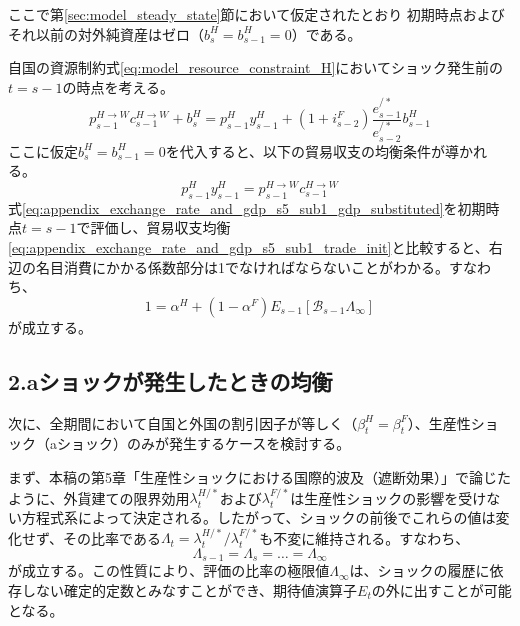 ここで第\ref{sec:model_steady_state}節において仮定されたとおり
初期時点およびそれ以前の対外純資産はゼロ（\(b_s^H=b_{s-1}^H=0\)）である。

自国の資源制約式\eqref{eq:model_resource_constraint_H}においてショック発生前の\(t=s-1\)の時点を考える。
\begin{equation}
    p_{s-1}^{H\to W}c_{s-1}^{H\to W}+b_s^H=p_{s-1}^Hy_{s-1}^H+(1+i_{s-2}^F)\frac{e_{s-1}^{/*}}{e_{s-2}^{/*}}b_{s-1}^H
    \label{eq:appendix_exchange_rate_and_gdp_s5_sub1_res_init}
\end{equation}
ここに仮定\(b_s^H=b_{s-1}^H=0\)を代入すると、以下の貿易収支の均衡条件が導かれる。
\begin{equation}
    p_{s-1}^Hy_{s-1}^H=p_{s-1}^{H\to W}c_{s-1}^{H\to W}
    \label{eq:appendix_exchange_rate_and_gdp_s5_sub1_trade_init}
\end{equation}
式\eqref{eq:appendix_exchange_rate_and_gdp_s5_sub1_gdp_substituted}を初期時点\(t=s-1\)で評価し、貿易収支均衡\eqref{eq:appendix_exchange_rate_and_gdp_s5_sub1_trade_init}と比較すると、右辺の名目消費にかかる係数部分は1でなければならないことがわかる。すなわち、
\begin{equation}
    1=\alpha^H+(1-\alpha^F)E_{s-1}\left[\mathcal{B}_{s-1}\Lambda_{\infty}\right]
    \label{eq:appendix_exchange_rate_and_gdp_s5_sub1_unity}
\end{equation}
が成立する。

\subsection*{2.aショックが発生したときの均衡}
\label{sec:appendix_exchange_rate_and_gdp_s5_sub2}

次に、全期間において自国と外国の割引因子が等しく（\(\beta_t^H=\beta_t^F\)）、生産性ショック（aショック）のみが発生するケースを検討する。

まず、本稿の第5章「生産性ショックにおける国際的波及（遮断効果）」で論じたように、外貨建ての限界効用\(\lambda_t^{H/*}\)および\(\lambda_t^{F/*}\)は生産性ショックの影響を受けない方程式系によって決定される。したがって、ショックの前後でこれらの値は変化せず、その比率である\(\Lambda_t=\lambda_t^{H/*}/\lambda_t^{F/*}\)も不変に維持される。すなわち、
\begin{equation}
    \Lambda_{s-1}=\Lambda_s=\dots=\Lambda_{\infty}
    \label{eq:appendix_exchange_rate_and_gdp_s5_sub2_lambda_constancy}
\end{equation}
が成立する。この性質により、評価の比率の極限値\(\Lambda_{\infty}\)は、ショックの履歴に依存しない確定的定数とみなすことができ、期待値演算子\(E_t\)の外に出すことが可能となる。

